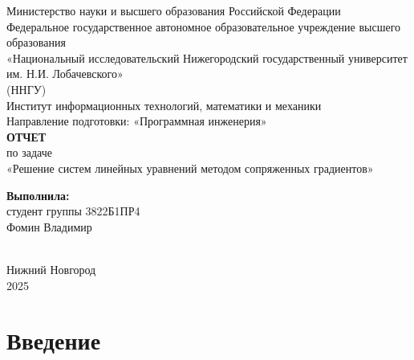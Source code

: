 \documentclass[12pt]{article}
\begin{document}
\begin{titlepage}
    \centering
    \large
    Министерство науки и высшего образования Российской Федерации\\[0.5cm]
    Федеральное государственное автономное образовательное учреждение высшего образования\\[0.5cm]
    «Национальный исследовательский Нижегородский государственный университет им. Н.И. Лобачевского» \\
    (ННГУ)\\[1cm]
    Институт информационных технологий, математики и механики\\[0.5cm]
    Направление подготовки: «Программная инженерия»\\[1cm]

    \vspace{1cm}
    {\LARGE \textbf{ОТЧЕТ}}\\[0.5cm]
    {\Large по задаче}\\[0.5cm]
    {\LARGE {«Решение систем линейных уравнений методом сопряженных градиентов»}}\\[0.5cm]
    \vspace{2cm}
    \hfill\parbox{0.4\textwidth}{
        \textbf{Выполнила:} \\
        студент группы 3822Б1ПР4 \\
        {Фомин Владимир}
    }\\[0.5cm]
    \vfill
    Нижний Новгород\\
    2025
\end{titlepage}


\thispagestyle{empty}
\clearpage
{} 
\setcounter{page}{2} 
\tableofcontents
\clearpage
\setcounter{page}{3} 
\section{Введение}
\end{document}
